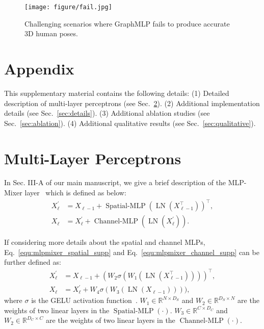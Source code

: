 \documentclass[lettersize,journal]{IEEEtran}
\begin{document}
\begin{figure}[t]
  \centering
  \texttt{[image: figure/fail.jpg]}
  \caption
  {
    Challenging scenarios where GraphMLP fails to produce accurate 3D human poses.
  }
  \label{fig:fail}
\end{figure}




\newpage
\section{Appendix}

This supplementary material contains the following details:
(1) Detailed description of multi-layer perceptrons (see Sec.~\ref{sec:mlp}). 
(2) Additional implementation details (see Sec.~\ref{sec:details}). 
(3) Additional ablation studies (see Sec.~\ref{sec:ablation}).
(4) Additional qualitative results (see Sec.~\ref{sec:qualitative}). 

\section{Multi-Layer Perceptrons}
\label{sec:mlp}
In Sec. III-A of our main manuscript, we give a brief description of the MLP-Mixer layer~\cite{mlpmixer} which is defined as below:
\begin{align}
  X^{\prime}_{\ell} &= X_{\ell-1} + \operatorname{Spatial-MLP}(\operatorname{LN}(X_{\ell-1}^{\top}))^{\top}, 
  \label{equ:mlpmixer_spatial_supp} \\
  X_{\ell} &= X^{\prime}_{\ell} + \operatorname{Channel-MLP}(\operatorname{LN}(X^{\prime}_{\ell})).
  \label{equ:mlpmixer_channel_supp}
\end{align}

If considering more details about the spatial and channel MLPs, Eq.~\eqref{equ:mlpmixer_spatial_supp} and Eq.~\eqref{equ:mlpmixer_channel_supp} can be further defined as:
\begin{align}
  X^{\prime}_{\ell} &= X_{\ell-1} + \left(W_{2} \sigma\left(W_{1}(\operatorname{LN}(X_{\ell-1}^{\top}))\right)\right)^{\top}, \label{equ:mlpmixer_spatial_supp_1}\\
  X_{\ell} &= X^{\prime}_{\ell} + W_{4} \sigma\left(W_{3}(\operatorname{LN}(X_{\ell-1}))\right)),
\end{align}
where $\sigma$ is the GELU activation function~\cite{hendrycks2016gaussian}.
$W_{1} \in \mathbb{R}^{N \times D_{S}}$ and $W_{2} \in \mathbb{R}^{D_{S} \times N}$ are the weights of two linear layers in the $\operatorname{Spatial-MLP}(\cdot)$. 
$W_{3} \in \mathbb{R}^{C \times D_{C}}$ and $W_{2} \in \mathbb{R}^{D_{C} \times C}$ are the weights of two linear layers in the $\operatorname{Channel-MLP}(\cdot)$. 
\end{document}
